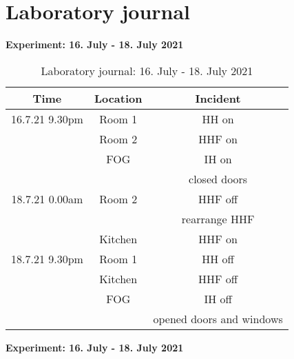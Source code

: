 \section{Laboratory journal}
\label{sec:appendix:Laborbuch}
\textbf{Experiment: 16. July - 18. July 2021}
\begin{table}[H]
    \centering
    \begin{tabular}{c|c|c}
        \textbf{Time} & \textbf{Location} & \textbf{Incident }\\
        \hline
        \hline
        16.7.21 9.30pm & Room 1 & HH on\\
        & Room 2 & HHF on\\
        & FOG & IH on\\
        && closed doors\\
        \hline
        18.7.21 0.00am & Room 2 & HHF off\\ 
        && rearrange HHF \\
        & Kitchen & HHF on\\
        \hline
        18.7.21 9.30pm & Room 1 & HH off\\
        & Kitchen & HHF off\\
        & FOG & IH off\\
        && opened doors and windows\\
    \end{tabular}
    \caption{Laboratory journal: 16. July - 18. July 2021}
    \label{tab:Experiment1app}
\end{table}
\textbf{Experiment: 16. July - 18. July 2021}

